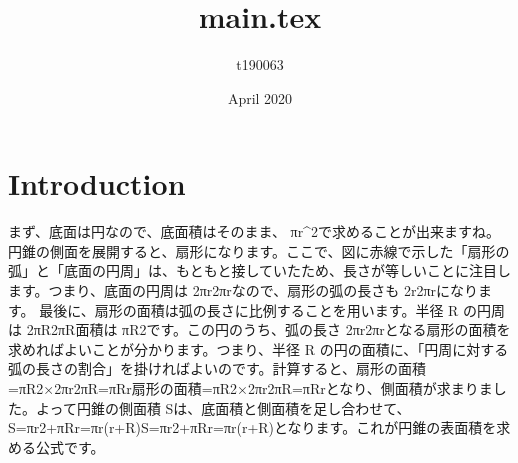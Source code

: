 \documentclass{article}
\title{main.tex}
\author{t190063 }
\date{April 2020}
\begin{document}
\maketitle
\section{Introduction}
まず、底面は円なので、底面積はそのまま、
πr^2で求めることが出来ますね。
円錐の側面を展開すると、扇形になります。ここで、図に赤線で示した「扇形の弧」と「底面の円周」は、もともと接していたため、長さが等しいことに注目します。つまり、底面の円周は 
2πr2πrなので、扇形の弧の長さも 2r2πrになります。
最後に、扇形の面積は弧の長さに比例することを用います。半径 R の円周は 2πR2πR面積は πR2です。この円のうち、弧の長さ 
2πr2πrとなる扇形の面積を求めればよいことが分かります。つまり、半径 R の円の面積に、「円周に対する弧の長さの割合」を掛ければよいのです。計算すると、扇形の面積=πR2×2πr2πR=πRr扇形の面積=πR2×2πr2πR=πRrとなり、側面積が求まりました。よって円錐の側面積 Sは、底面積と側面積を足し合わせて、S=πr2+πRr=πr(r+R)S=πr2+πRr=πr(r+R)となります。これが円錐の表面積を求める公式です。
\end{document}
